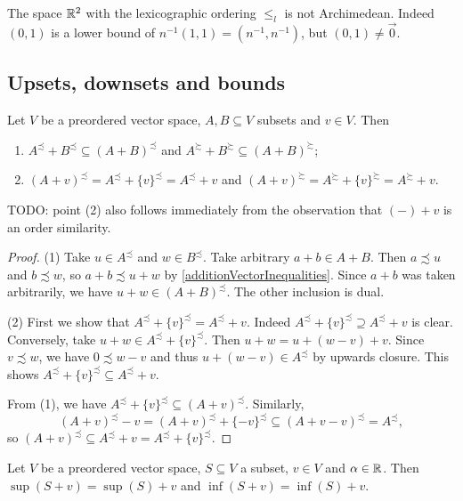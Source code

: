 \begin{example}
The space $\mathbb{R}^2$ with the lexicographic ordering $\leq_l$ is not Archimedean. Indeed $(0,1)$ is a lower bound of $n^{-1}(1,1) = (n^{-1}, n^{-1})$, but $(0,1) \neq \vec{0}$.
\end{example}

\subsection{Upsets, downsets and bounds}
\begin{lemma} \label{sumUpperLowerBounds}
Let $V$ be a preordered vector space, $A, B\subseteq V$ subsets and $v\in V$. Then
\begin{enumerate}
\item $A^\precsim + B^\precsim \subseteq (A + B)^\precsim$ and $A^\succsim + B^\succsim \subseteq (A + B)^\succsim$;
\item $(A+v)^\precsim = A^\precsim + \{v\}^\precsim = A^\precsim + v$ and $(A+v)^\succsim = A^\succsim + \{v\}^\succsim = A^\succsim + v$.
\end{enumerate}
\end{lemma}
TODO: point (2) also follows immediately from the observation that $(-)+v$ is an order similarity.
\begin{proof}
(1) Take $u\in A^\precsim$ and $w\in B^\precsim$. Take arbitrary $a+b\in A+B$. Then $a\precsim u$ and $b\precsim w$, so $a+b \precsim u+w$ by \ref{additionVectorInequalities}. Since $a+b$ was taken arbitrarily, we have $u+w \in (A+B)^\precsim$. The other inclusion is dual.

(2) First we show that $A^\precsim + \{v\}^\precsim = A^\precsim + v$. Indeed $A^\precsim + \{v\}^\precsim \supseteq A^\precsim + v$ is clear. Conversely, take $u + w \in A^\precsim + \{v\}^\precsim$. Then $u+ w = u + (w-v) + v$. Since $v\precsim w$, we have $0\precsim w-v$ and thus $u + (w-v)\in A^\precsim$ by upwards closure. This shows $A^\precsim + \{v\}^\precsim \subseteq A^\precsim + v$.

From (1), we have $A^\precsim+ \{v\}^\precsim \subseteq (A+ v)^\precsim$. Similarly,
\[ (A+v)^\precsim - v = (A+v)^\precsim + \{-v\}^\precsim \subseteq (A+v - v)^\precsim = A^\precsim, \]
so $(A+v)^\precsim \subseteq A^\precsim + v = A^\precsim+ \{v\}^\precsim$.
\end{proof}
\begin{corollary} \label{vectorSumOrderHomomorphism}
Let $V$ be a preordered vector space, $S\subseteq V$ a subset, $v\in V$ and $\alpha\in \mathbb{R}$. Then $\sup(S+v) = \sup(S)+v$ and $\inf(S+v) = \inf(S)+v$.
\end{corollary}

